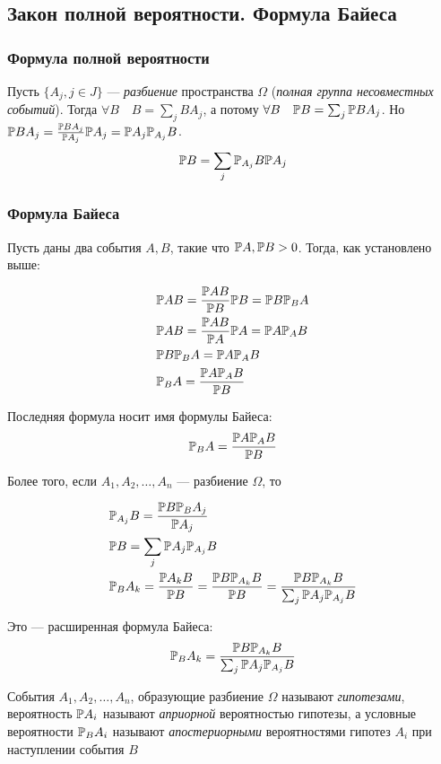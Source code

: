 \subsection{Закон полной вероятности. Формула
Байеса}\label{ux437ux430ux43aux43eux43d-ux43fux43eux43bux43dux43eux439-ux432ux435ux440ux43eux44fux442ux43dux43eux441ux442ux438.-ux444ux43eux440ux43cux443ux43bux430-ux431ux430ux439ux435ux441ux430}

\subsubsection{Формула полной
вероятности}\label{ux444ux43eux440ux43cux443ux43bux430-ux43fux43eux43bux43dux43eux439-ux432ux435ux440ux43eux44fux442ux43dux43eux441ux442ux438}

Пусть \(\{ A_j, j\in J\}\) --- \emph{разбиение} пространства \(\Omega\)
(\emph{полная группа несовместных событий}). Тогда
\(\forall B \quad B = \sum_j B A_j\), а потому
\(\forall B \quad \mathbb P B = \sum_j \mathbb P B A_j\). Но
\(\mathbb P B A_j = \frac{\mathbb P B A_j}{\mathbb P A_j} \mathbb P A_j = \mathbb P A_j \mathbb P_{A_j} B\).
\[ \mathbb P B = \sum_j \mathbb P_{A_j} B \mathbb P A_j \]

\subsubsection{Формула
Байеса}\label{ux444ux43eux440ux43cux443ux43bux430-ux431ux430ux439ux435ux441ux430}

Пусть даны два события \(A, B\), такие что \(\mathbb P A, \mathbb P B > 0\). Тогда,
как установлено выше:

\[\begin{aligned}
& \mathbb P AB = \frac{\mathbb P AB}{\mathbb P B} \mathbb P B = \mathbb P B \mathbb P_B A \\
& \mathbb P AB = \frac{\mathbb P AB}{\mathbb P A} \mathbb P A = \mathbb P A \mathbb P_A B \\
& \mathbb P B \mathbb P_B A = \mathbb P A \mathbb P_A B \\
& \mathbb P_B A = \frac{\mathbb P A \mathbb P_A B}{\mathbb P B}
\end{aligned}\]

Последняя формула носит имя формулы Байеса:
\[\mathbb P_B A = \frac{\mathbb P A \mathbb P_A B}{\mathbb P B}\]

Более того, если \(A_1, A_2, \ldots, A_n\) --- разбиение \(\Omega\), то

\[\begin{aligned}
& \mathbb P_{A_j} B = \frac{\mathbb P B \mathbb P_B A_j}{\mathbb P A_j} \\
& \mathbb P B   = \sum_j \mathbb P A_j \mathbb P_{A_j} B \\
& \mathbb P_B A_k = \frac{\mathbb P A_k B}{\mathbb P B} = \frac{\mathbb P B \mathbb P_{A_k} B}{\mathbb P B} = \frac{\mathbb P B \mathbb P_{A_k} B}{\sum_j \mathbb P A_j \mathbb P_{A_j} B}
\end{aligned}\]

Это --- расширенная формула Байеса:
\[\mathbb P_B A_k = \frac{\mathbb P B \mathbb P_{A_k} B}{\sum_j \mathbb P A_j \mathbb P_{A_j} B}\]

События \(A_1, A_2, \ldots, A_n\), образующие разбиение \(\Omega\)
называют \emph{гипотезами}, вероятность \(\mathbb P A_i\) называют
\emph{априорной} вероятностью гипотезы, а условные вероятности
\(\mathbb P_B A_i\) называют \emph{апостериорными} вероятностями гипотез
\(A_i\) при наступлении события \(B\)
